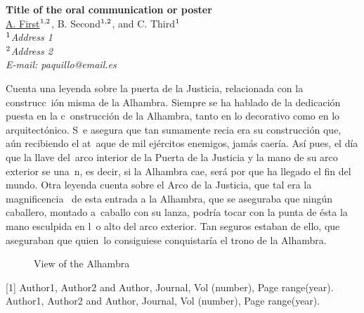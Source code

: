 \documentclass[12pt,a4paper]{article} %
\begin{document}
\begin{center}
{\bf \large Title of the oral communication or poster }
\\
\underline{A. First}$^{\rm 1,2}$, B. Second$^{\rm 1,2}$, and C. Third$^{\rm 1}$
\\
$^{\rm 1}${\it Address 1} \\ 
$^{\rm 2}${\it Address 2} \\
{\it E-mail: paquillo@email.es }
\end{center}

\vspace{12pt}

Cuenta una leyenda sobre la puerta de la Justicia, relacionada con la construcc\
ión misma de la Alhambra. Siempre se ha hablado de la dedicación puesta en la c\
onstrucción de la Alhambra, tanto en lo decorativo como en lo arquitectónico. S\
e asegura que tan sumamente recia era su construcción que, aún recibiendo el at\
aque de mil ejércitos enemigos, jamás caería. Así pues, el día que la llave del\
 arco interior de la Puerta de la Justicia y la mano de su arco exterior se una\
n, es decir, si la Alhambra cae, será por que ha llegado el fin del mundo.
Otra leyenda cuenta sobre el Arco de la Justicia, que tal era la magnificencia \
de esta entrada a la Alhambra, que se aseguraba que ningún caballero, montado a\
 caballo con su lanza, podría tocar con la punta de ésta la mano esculpida en l\
o alto del arco exterior. Tan seguros estaban de ello, que aseguraban que quien\
 lo consiguiese conquistaría el trono de la Alhambra.

\vspace{12pt}

\begin{figure}[h]
 \centerline{}
 \caption[]{View of the Alhambra}\label{figure 1}
\end{figure}

\vspace{5cm}

{\footnotesize
[1] Author1, Author2 and Author, Journal, Vol (number), Page range(year).
\newline
[2] Author1, Author2 and Author, Journal, Vol (number), Page range(year).
}
\end{document}
